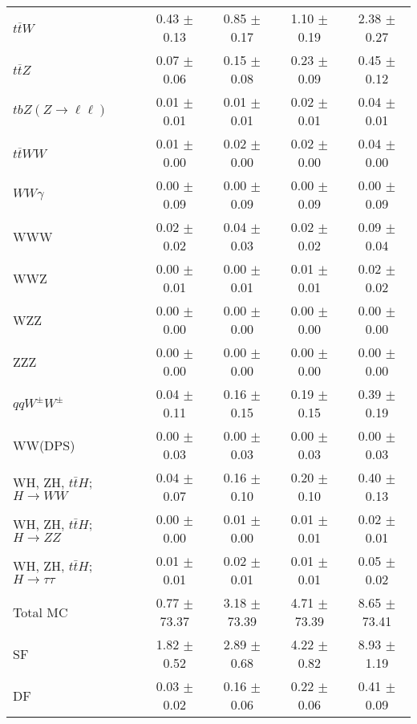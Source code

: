 \begin{tabular}{l|cccc}
                   $t\overline{t}W$ &  0.43 $\pm$  0.13 &  0.85 $\pm$  0.17 &  1.10 $\pm$  0.19 &  2.38 $\pm$  0.27 \\
                   $t\overline{t}Z$ &  0.07 $\pm$  0.06 &  0.15 $\pm$  0.08 &  0.23 $\pm$  0.09 &  0.45 $\pm$  0.12 \\
    $tbZ (Z \rightarrow \ell \ell)$ &  0.01 $\pm$  0.01 &  0.01 $\pm$  0.01 &  0.02 $\pm$  0.01 &  0.04 $\pm$  0.01 \\
                  $t\overline{t}WW$ &  0.01 $\pm$  0.00 &  0.02 $\pm$  0.00 &  0.02 $\pm$  0.00 &  0.04 $\pm$  0.00 \\
                         $WW\gamma$ &  0.00 $\pm$  0.09 &  0.00 $\pm$  0.09 &  0.00 $\pm$  0.09 &  0.00 $\pm$  0.09 \\
                                WWW &  0.02 $\pm$  0.02 &  0.04 $\pm$  0.03 &  0.02 $\pm$  0.02 &  0.09 $\pm$  0.04 \\
                                WWZ &  0.00 $\pm$  0.01 &  0.00 $\pm$  0.01 &  0.01 $\pm$  0.01 &  0.02 $\pm$  0.02 \\
                                WZZ &  0.00 $\pm$  0.00 &  0.00 $\pm$  0.00 &  0.00 $\pm$  0.00 &  0.00 $\pm$  0.00 \\
                                ZZZ &  0.00 $\pm$  0.00 &  0.00 $\pm$  0.00 &  0.00 $\pm$  0.00 &  0.00 $\pm$  0.00 \\
                 $qqW^{\pm}W^{\pm}$ &  0.04 $\pm$  0.11 &  0.16 $\pm$  0.15 &  0.19 $\pm$  0.15 &  0.39 $\pm$  0.19 \\
                            WW(DPS) &  0.00 $\pm$  0.03 &  0.00 $\pm$  0.03 &  0.00 $\pm$  0.03 &  0.00 $\pm$  0.03 \\
WH, ZH, $t\bar{t}H$; $H \rightarrow WW$ &  0.04 $\pm$  0.07 &  0.16 $\pm$  0.10 &  0.20 $\pm$  0.10 &  0.40 $\pm$  0.13 \\
WH, ZH, $t\bar{t}H$; $H \rightarrow ZZ$ &  0.00 $\pm$  0.00 &  0.01 $\pm$  0.00 &  0.01 $\pm$  0.01 &  0.02 $\pm$  0.01 \\
WH, ZH, $t\bar{t}H$; $H \rightarrow \tau\tau$ &  0.01 $\pm$  0.01 &  0.02 $\pm$  0.01 &  0.01 $\pm$  0.01 &  0.05 $\pm$  0.02 \\
\hline\hline
                           Total MC &  0.77 $\pm$ 73.37 &  3.18 $\pm$ 73.39 &  4.71 $\pm$ 73.39 &  8.65 $\pm$ 73.41 \\
\hline
                                 SF &  1.82 $\pm$  0.52 &  2.89 $\pm$  0.68 &  4.22 $\pm$  0.82 &  8.93 $\pm$  1.19 \\
                                 DF &  0.03 $\pm$  0.02 &  0.16 $\pm$  0.06 &  0.22 $\pm$  0.06 &  0.41 $\pm$  0.09 \\

\end{tabular}
